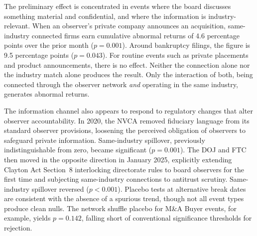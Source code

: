 The preliminary effect is concentrated in events where the board discusses something material and confidential, and where the information is industry-relevant. When an observer's private company announces an acquisition, same-industry connected firms earn cumulative abnormal returns of 4.6 percentage points over the prior month ($p=0.001$). Around bankruptcy filings, the figure is 9.5 percentage points ($p=0.043$). For routine events such as private placements and product announcements, there is no effect. Neither the connection alone nor the industry match alone produces the result. Only the interaction of both, being connected through the observer network \textit{and} operating in the same industry, generates abnormal returns.

The information channel also appears to respond to regulatory changes that alter observer accountability. In 2020, the NVCA removed fiduciary language from its standard observer provisions, loosening the perceived obligation of observers to safeguard private information. Same-industry spillover, previously indistinguishable from zero, became significant ($p=0.001$). The DOJ and FTC then moved in the opposite direction in January 2025, explicitly extending Clayton Act Section~8 interlocking directorate rules to board observers for the first time and subjecting same-industry connections to antitrust scrutiny. Same-industry spillover reversed ($p<0.001$). Placebo tests at alternative break dates are consistent with the absence of a spurious trend, though not all event types produce clean nulls. The network shuffle placebo for M\&A Buyer events, for example, yields $p=0.142$, falling short of conventional significance thresholds for rejection.

